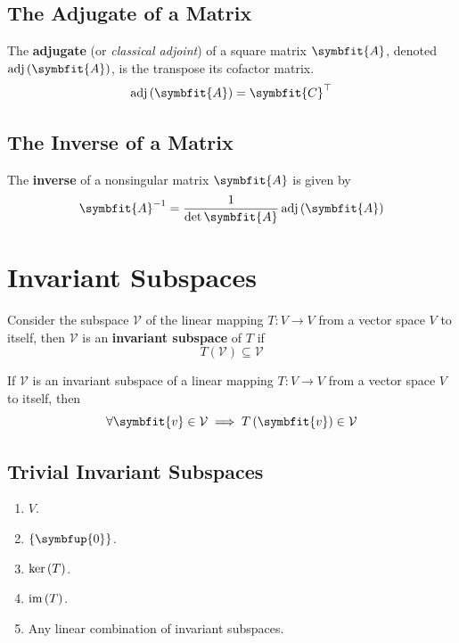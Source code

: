 \documentclass{article}
\begin{document}
\subsection{The Adjugate of a Matrix}
\begin{definition}
    The \textbf{adjugate} (or \textit{classical adjoint}) of a square
    matrix \(\symbfit{A}\), denoted
    \(\adj{\left( \symbfit{A} \right)}\), is the transpose its cofactor
    matrix.
    \begin{equation*}
        \adj{\left( \symbfit{A} \right)} = \symbfit{C}^\top
    \end{equation*}
\end{definition}
\subsection{The Inverse of a Matrix}
\begin{theorem}
    The \textbf{inverse} of a nonsingular matrix \(\symbfit{A}\) is
    given by
    \begin{equation*}
        \symbfit{A}^{-1}=\frac{1}{\det{\symbfit{A}}} \adj{\left( \symbfit{A} \right)}
    \end{equation*}
\end{theorem}
\newpage
\section{Invariant Subspaces}
\begin{definition}
    Consider the subspace \(\mathcal{V}\) of the linear mapping
    \(T:V\rightarrow V\) from a vector space \(V\) to itself, then
    \(\mathcal{V}\) is an \textbf{invariant subspace} of \(T\) if
    \begin{equation*}
        T\left(\mathcal{V}\right)\subseteq \mathcal{V}
    \end{equation*}
\end{definition}
\begin{theorem}
    If \(\mathcal{V}\) is an invariant subspace of a linear mapping
    \(T: V \rightarrow V\) from a vector space \(V\) to itself, then
    \begin{equation*}
        \forall \symbfit{v}\in \mathcal{V}\implies T\left(\symbfit{v}\right)\in \mathcal{V}
    \end{equation*}
\end{theorem}
\subsection{Trivial Invariant Subspaces}
\begin{enumerate}
    \item \(V\).
    \item \(\left\{ \symbfup{0} \right\}\).
    \item \(\operatorname{ker}{\left( T \right)}\).
    \item \(\operatorname{im}{\left( T \right)}\).
    \item Any linear combination of invariant subspaces.
\end{enumerate}
\end{document}

